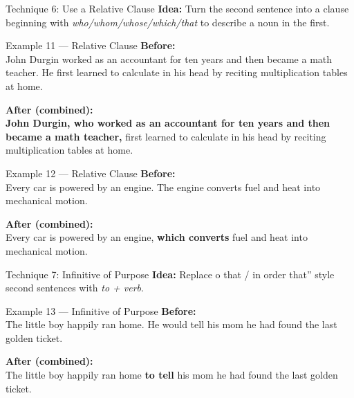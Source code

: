 \documentclass[aspectratio=169,11pt]{beamer}
\begin{document}
\begin{frame}{Technique 6: Use a Relative Clause}
\small
\textbf{Idea:} Turn the second sentence into a clause beginning with \emph{who/whom/whose/which/that} to describe a noun in the first.
\end{frame}

\begin{frame}{Example 11 — Relative Clause}
\small
\textbf{Before:}\\
John Durgin worked as an accountant for ten years and then became a math teacher. He first learned to calculate in his head by reciting multiplication tables at home.

\vspace{0.5em}
\textbf{After (combined):}\\
\textbf{John Durgin, who worked as an accountant for ten years and then became a math teacher,} first learned to calculate in his head by reciting multiplication tables at home.
\end{frame}

\begin{frame}{Example 12 — Relative Clause}
\small
\textbf{Before:}\\
Every car is powered by an engine. The engine converts fuel and heat into mechanical motion.

\vspace{0.5em}
\textbf{After (combined):}\\
Every car is powered by an engine, \textbf{which converts} fuel and heat into mechanical motion.
\end{frame}

\begin{frame}{Technique 7: Infinitive of Purpose}
\small
\textbf{Idea:} Replace o that / in order that” style second sentences with \emph{to + verb}.
\end{frame}

\begin{frame}{Example 13 — Infinitive of Purpose}
\small
\textbf{Before:}\\
The little boy happily ran home. He would tell his mom he had found the last golden ticket.

\vspace{0.5em}
\textbf{After (combined):}\\
The little boy happily ran home \textbf{to tell} his mom he had found the last golden ticket.
\end{frame}
\end{document}
